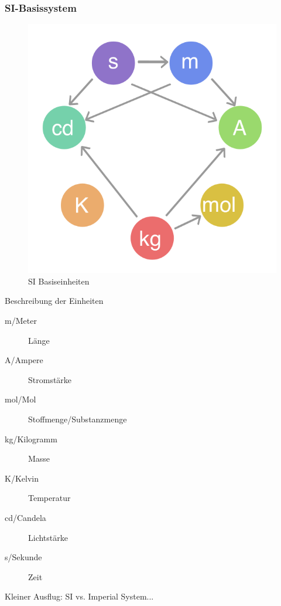 \begin{frame}
  \frametitle{SI-Basissystem}

  \begin{center}
    \begin{figure}
      \includegraphics[height=0.75\textheight]{e01/SI_base_unit.png}
      \caption{SI Basiseinheiten \cite{dj4uf}}
      \label{fig_si_basis}
    \end{figure}
  \end{center}

\end{frame}

\begin{frame}
  \begin{block}{Beschreibung der Einheiten}
    \begin{description}
      \item[m/Meter] Länge
      \item[A/Ampere] Stromstärke
      \item[mol/Mol] Stoffmenge/Substanzmenge
      \item[kg/Kilogramm] Masse
      \item[K/Kelvin] Temperatur
      \item[cd/Candela] Lichtstärke
      \item[s/Sekunde] Zeit
    \end{description}
  \end{block}

  \pause
  Kleiner Ausflug: SI vs. Imperial System...
\end{frame}

